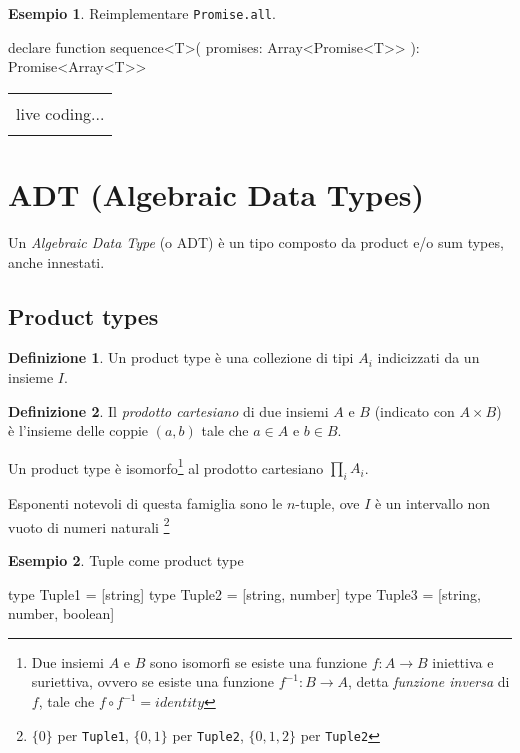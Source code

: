 \documentclass[12pt]{article}
\theoremstyle{definition}
\newtheorem{definition}{Definizione}[section]
\newtheorem{example}{Esempio}[subsection]
\newenvironment{boxed}
    {\begin{center}
    \begin{tabular}{|p{0.9\textwidth}|}
    \hline\\
    }
    {
    \\\\\hline
    \end{tabular}
    \end{center}
    }
\newenvironment{code}
  {\vspace{0.5cm} \VerbatimEnvironment\begin{typescriptcode}}
  {\end{typescriptcode} \vspace{0.2cm}}
\begin{document}
\begin{example}
Reimplementare \texttt{Promise.all}.

\begin{code}
declare function sequence<T>(
  promises: Array<Promise<T>>
): Promise<Array<T>>
\end{code}

\end{example}

\begin{boxed}
live coding...
\end{boxed}

\newpage
\section{ADT (Algebraic Data Types)}

Un \emph{Algebraic Data Type} (o ADT) è un tipo composto da product e/o sum types, anche innestati.

\subsection{Product types}

\begin{definition}
Un product type è una collezione di tipi $A_i$ indicizzati da un insieme $I$.
\end{definition}

\begin{definition}
Il \emph{prodotto cartesiano} di due insiemi $A$ e $B$ (indicato con $A \times B$)
è l'insieme delle coppie $(a, b)$ tale che $a \in A$ e $b \in B$.
\end{definition}

Un product type è isomorfo\footnote{Due insiemi $A$ e $B$ sono isomorfi se esiste una funzione $f: A \rightarrow B$ iniettiva e suriettiva,
ovvero se esiste una funzione $f^{-1}: B \rightarrow A$, detta \emph{funzione inversa} di $f$, tale che $f \circ f^{-1} = identity$}
al prodotto cartesiano $\prod_i A_i$.

Esponenti notevoli di questa famiglia sono le $n$-tuple, ove $I$ è un intervallo non vuoto di numeri naturali
\footnote{$\{0\}$ per \texttt{Tuple1}, $\{0, 1\}$ per \texttt{Tuple2}, $\{0, 1, 2\}$ per \texttt{Tuple2}}

\begin{example}
Tuple come product type

\begin{code}
type Tuple1 = [string]
type Tuple2 = [string, number]
type Tuple3 = [string, number, boolean]
\end{code}
\end{example}
\end{document}
